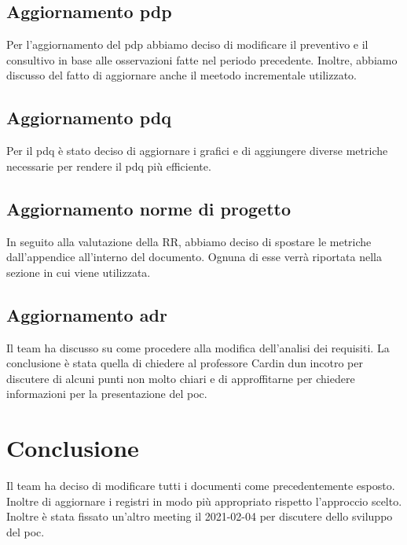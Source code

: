 \subsection{Aggiornamento pdp}
Per l'aggiornamento del pdp abbiamo deciso di modificare il preventivo e il consultivo in base alle osservazioni fatte nel periodo precedente. 
Inoltre, abbiamo discusso del fatto di aggiornare anche il meetodo incrementale utilizzato. 

\subsection{Aggiornamento pdq}
Per il pdq è stato deciso di aggiornare i grafici e di aggiungere diverse metriche necessarie per rendere il pdq più efficiente.

\subsection{Aggiornamento norme di progetto}
In seguito alla valutazione della RR, abbiamo deciso di spostare le metriche dall'appendice all'interno del documento.
Ognuna di esse verrà riportata nella sezione in cui viene utilizzata.

\subsection{Aggiornamento adr}
Il team ha discusso su come procedere alla modifica dell'analisi dei requisiti. La conclusione è stata quella di chiedere al professore Cardin dun incotro per discutere di alcuni punti non molto chiari e di approffitarne per chiedere informazioni per la presentazione del poc.

\section{Conclusione}
Il team ha deciso di modificare tutti i documenti come precedentemente esposto. Inoltre di aggiornare i registri in modo più appropriato rispetto l'approccio scelto.
Inoltre è stata fissato un'altro meeting il 2021-02-04 per discutere dello sviluppo del poc.

